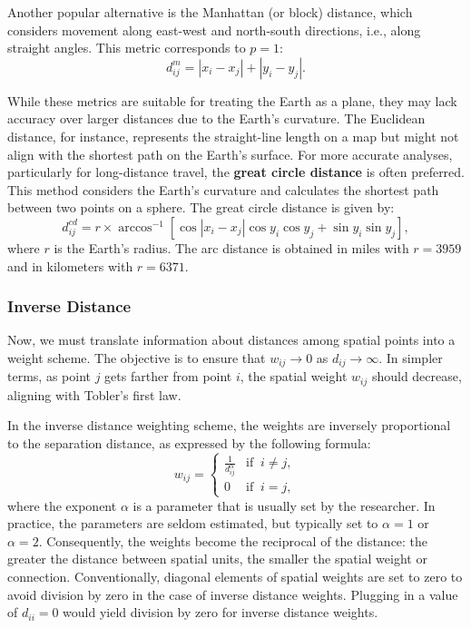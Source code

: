 Another popular alternative is the Manhattan (or block) distance, which considers movement along east-west and north-south directions, i.e., along straight angles. This metric corresponds to $p = 1$:
\begin{equation*}
   d_{ij}^m = \left|x_i - x_j\right| + \left|y_i - y_j\right|.
\end{equation*}

While these metrics are suitable for treating the Earth as a plane, they may lack accuracy over larger distances due to the Earth's curvature. The Euclidean distance, for instance, represents the straight-line length on a map but might not align with the shortest path on the Earth's surface. For more accurate analyses, particularly for long-distance travel, the \textbf{great circle distance} is often preferred. This method considers the Earth's curvature and calculates the shortest path between two points on a sphere. The great circle distance is given by:
\begin{equation*}
d_{ij}^{cd} = r \times \arccos^{-1}\left[\cos|x_i - x_j| \cos y_i \cos y_j + \sin y_i \sin y_j \right],
\end{equation*}
%
where $r$ is the Earth's radius. The arc distance is obtained in miles with $r = 3959$ and in kilometers with $r = 6371$.

\subsubsection{Inverse Distance}\label{sec:inverse_distance}

Now, we must translate information about distances among spatial points into a weight scheme. The objective is to ensure that $w_{ij} \to 0$ as $d_{ij} \to \infty$. In simpler terms, as point $j$ gets farther from point $i$, the spatial weight $w_{ij}$ should decrease, aligning with Tobler's first law.

In the inverse distance weighting scheme, the weights are inversely proportional to the separation distance, as expressed by the following formula:
\begin{equation*}
  w_{ij} =
  \begin{cases}
  \frac{1}{d_{ij}^{\alpha}} & \mbox{if} \;\;i \neq j, \\
  0 & \mbox{if}\;\; i = j,
  \end{cases}
\end{equation*}
%
where the exponent $\alpha$ is a parameter that is usually set by the researcher. In practice, the parameters are seldom estimated, but typically set to $\alpha = 1$ or $\alpha = 2$. Consequently, the weights become the reciprocal of the distance: the greater the distance between spatial units, the smaller the spatial weight or connection. Conventionally, diagonal elements of spatial weights are set to zero to avoid division by zero in the case of inverse distance weights. Plugging in a value of $d_{ii} = 0$ would yield division by zero for inverse distance weights. 

